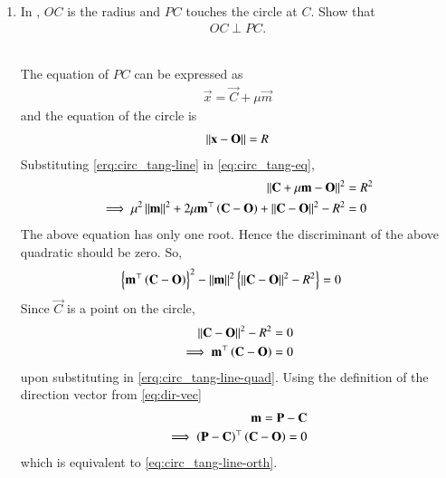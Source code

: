 %
\begin{enumerate}[label=\thesection.\arabic*.,ref=\thesection.\theenumi]
\item 
		In ,  $OC$ is the radius and $PC$ touches the circle at $C$.  Show that	
  \begin{align}
	  OC \perp PC.
		\label{eq:circ_tang-line-orth}	
  \end{align}
	\begin{figure}[!ht]
		\begin{center}
			
			\resizebox{\columnwidth}{!}{}
		\end{center}
		\caption{}
		\label{fig:circ_tang}	
	\end{figure}
	\\
		\solution
		The equation of $PC$ can be expressed as
  \begin{align}
		\label{erq:circ_tang-line}	
	  \vec{x} = 
	  \vec{C} + \mu\vec{m}
  \end{align}
  and the equation of the circle is 
  \begin{align}
		\label{eq:circ_tang-eq}	
	  \left\lVert\mathbf{x}-\mathbf{O}\right\rVert = R
  \end{align}
  Substituting
		\eqref{erq:circ_tang-line}	
		in 
		\eqref{eq:circ_tang-eq},
  \begin{align}
	  \left\lVert\mathbf{C} + \mu\mathbf{m}- \mathbf{O}\right\rVert^2 &= R^2
	  \\
	  \implies	  \mu^2 \left\lVert \mathbf{m}\right\rVert^2 
	  + 2\mu\mathbf{m}^{\top}\left(\mathbf{C} -\mathbf{O}\right)
	  + \left\lVert\mathbf{C}-\mathbf{O}\right\rVert^2 - R^2 &= 0
  \end{align}
  The above equation has only one root.  Hence the discriminant of the above quadratic should be zero. So, 
  \begin{align}
	  \left\{\mathbf{m}^{\top}\left(\mathbf{C} -\mathbf{O}\right)\right\}^2-\left\lVert \mathbf{m}\right\rVert^2 
	  \left\{ \left\lVert\mathbf{C}-\mathbf{O}\right\rVert^2 - R^2\right\} &= 0
		\label{erq:circ_tang-line-quad}	
  \end{align}
  Since $\vec{C}$ is a point on the circle, 
  \begin{align}
	   \left\lVert\mathbf{C}-\mathbf{O}\right\rVert^2 - R^2 = 0
	   \\
	   \implies 
	  \mathbf{m}^{\top}\left(\mathbf{C} -\mathbf{O}\right) = 0
		\label{eq:circ_tang-line-orth-dir}	
  \end{align}
upon substituting in \eqref{erq:circ_tang-line-quad}. Using the definition of the direction vector from 	
\eqref{eq:dir-vec}
  \begin{align}
	  \mathbf{m}=\mathbf{P}-\mathbf{C} 
	\\
	  \implies 
	  \left(\mathbf{P}-\mathbf{C}\right)^{\top}\left(\mathbf{C} -\mathbf{O}\right) = 0
		\label{eq:circ_tang-line-orth-pc}
  \end{align}
		which is equivalent to 
		\eqref{eq:circ_tang-line-orth}.


\end{enumerate}
